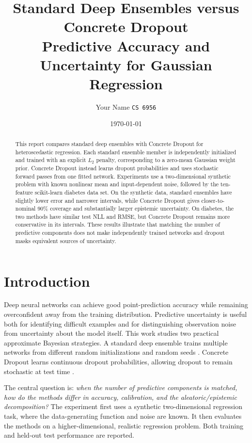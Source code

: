 \documentclass[10pt,twocolumn]{article}
\title{\textbf{Standard Deep Ensembles versus Concrete Dropout}\\
\large Predictive Accuracy and Uncertainty for Gaussian Regression}
\author{Your Name \quad\texttt{CS 6956}}
\date{\today}
\begin{document}
\maketitle

\begin{abstract}
This report compares standard deep ensembles with Concrete Dropout for
heteroscedastic regression.  Each standard ensemble member is independently
initialized and trained with an explicit $L_2$ penalty, corresponding to a
zero-mean Gaussian weight prior.  Concrete Dropout instead learns dropout
probabilities and uses stochastic forward passes from one fitted network.
Experiments use a two-dimensional synthetic problem with known nonlinear mean
and input-dependent noise, followed by the ten-feature scikit-learn diabetes
data set.  On the synthetic data, standard ensembles have slightly lower
error and narrower intervals, while Concrete Dropout gives closer-to-nominal
90\% coverage and substantially larger epistemic uncertainty.  On diabetes,
the two methods have similar test NLL and RMSE, but Concrete Dropout remains
more conservative in its intervals.  These results illustrate that matching
the number of predictive components does not make independently trained
networks and dropout masks equivalent sources of uncertainty.
\end{abstract}

\section{Introduction}
Deep neural networks can achieve good point-prediction accuracy while
remaining overconfident away from the training distribution.  Predictive
uncertainty is useful both for identifying difficult examples and for
distinguishing observation noise from uncertainty about the model itself.
This work studies two practical approximate Bayesian strategies.  A standard
deep ensemble trains multiple networks from different random initializations
and random seeds \cite{lakshminarayanan2017}.  Concrete Dropout learns
continuous dropout probabilities, allowing dropout to remain stochastic at
test time \cite{gal2017concrete}.

The central question is: \emph{when the number of predictive components is
matched, how do the methods differ in accuracy, calibration, and the
aleatoric/epistemic decomposition?}  The experiment first uses a synthetic
two-dimensional regression task, where the data-generating function and noise
are known.  It then evaluates the methods on a higher-dimensional,
realistic regression problem.  Both training and held-out test performance
are reported.
\end{document}
